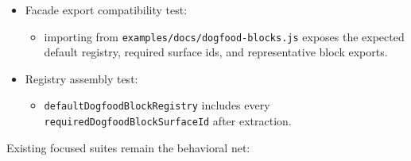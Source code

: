 \begin{itemize}
\tightlist
\item
  Facade export compatibility test:

  \begin{itemize}
  \tightlist
  \item
    importing from \texttt{e\allowbreak{}x\allowbreak{}a\allowbreak{}m\allowbreak{}p\allowbreak{}l\allowbreak{}e\allowbreak{}s\allowbreak{}/\allowbreak{}d\allowbreak{}o\allowbreak{}c\allowbreak{}s\allowbreak{}/\allowbreak{}d\allowbreak{}o\allowbreak{}g\allowbreak{}f\allowbreak{}o\allowbreak{}o\allowbreak{}d\allowbreak{}-\allowbreak{}b\allowbreak{}l\allowbreak{}o\allowbreak{}c\allowbreak{}k\allowbreak{}s\allowbreak{}.\allowbreak{}j\allowbreak{}s} exposes the expected default registry, required surface ids, and representative block exports.
  \end{itemize}
\item
  Registry assembly test:

  \begin{itemize}
  \tightlist
  \item
    \texttt{d\allowbreak{}e\allowbreak{}f\allowbreak{}a\allowbreak{}u\allowbreak{}l\allowbreak{}t\allowbreak{}D\allowbreak{}o\allowbreak{}g\allowbreak{}f\allowbreak{}o\allowbreak{}o\allowbreak{}d\allowbreak{}B\allowbreak{}l\allowbreak{}o\allowbreak{}c\allowbreak{}k\allowbreak{}R\allowbreak{}e\allowbreak{}g\allowbreak{}i\allowbreak{}s\allowbreak{}t\allowbreak{}r\allowbreak{}y} includes every \texttt{r\allowbreak{}e\allowbreak{}q\allowbreak{}u\allowbreak{}i\allowbreak{}r\allowbreak{}e\allowbreak{}d\allowbreak{}D\allowbreak{}o\allowbreak{}g\allowbreak{}f\allowbreak{}o\allowbreak{}o\allowbreak{}d\allowbreak{}B\allowbreak{}l\allowbreak{}o\allowbreak{}c\allowbreak{}k\allowbreak{}S\allowbreak{}u\allowbreak{}r\allowbreak{}f\allowbreak{}a\allowbreak{}c\allowbreak{}e\allowbreak{}I\allowbreak{}d} after extraction.
  \end{itemize}
\end{itemize}

Existing focused suites remain the behavioral net:

